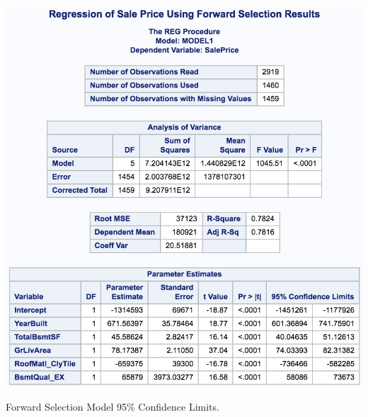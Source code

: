 \documentclass[11pt]{scrartcl} %
\begin{document}
\hrulefill
\begin{table}[H] %
	\centering %
	\includegraphics[scale=.3]{../graphics/A2FWCI}
	\caption{Forward Selection Model 95\% Confidence Limits.} %
	\label{tab:A2FWCI}
\end{table}
\hrulefill
\end{document}
